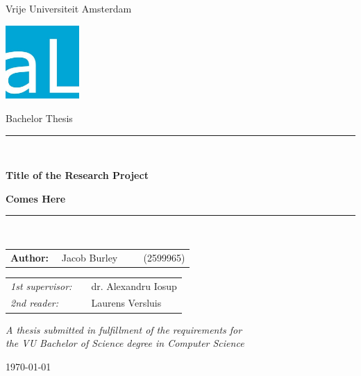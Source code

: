 \documentclass[11pt]{article}
\begin{document}
\thispagestyle{empty}
\newcommand{\opendc}{OpenDC}

\begin{center}

Vrije Universiteit Amsterdam

\vspace{1mm}

\includegraphics[height=28mm]{images/atLarge.jpg}

\vspace{1.5cm}

{\Large Bachelor Thesis}

\vspace*{1.5cm}

\rule{.9\linewidth}{.6pt}\\[0.4cm]
{\huge \bfseries Title of the Research Project\par}
{\huge \bfseries Comes Here\par}\vspace{0.4cm}
\rule{.9\linewidth}{.6pt}\\[1.5cm]

\vspace*{2mm}

{\Large
\begin{tabular}{l}
{\bf Author:} ~~Jacob Burley ~~~~ (2599965)
\end{tabular}
}

\vspace*{1.5cm}

\begin{tabular}{ll}
{\it 1st supervisor:}   & ~~dr. Alexandru Iosup \\
{\it 2nd reader:}       & ~~Laurens Versluis
\end{tabular}

\vspace*{2cm}

\textit{A thesis submitted in fulfillment of the requirements for\\ the VU Bachelor of Science degree in Computer Science}

\vspace*{1cm}

\today\\[4cm] %

\end{center}
\end{document}
